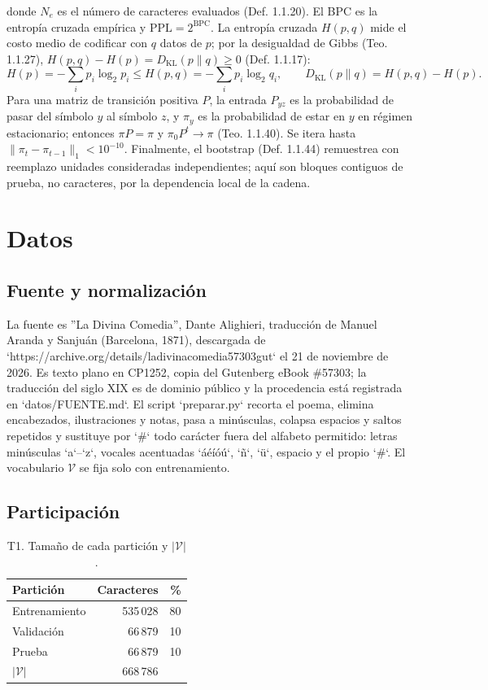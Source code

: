 \documentclass[11pt,letterpaper]{article}
\newcommand{\V}{\mathcal{V}}
\begin{document}
	donde $N_e$ es el número de caracteres evaluados (Def. 1.1.20). El BPC es la entropía cruzada empírica y $\mathrm{PPL}=2^{\mathrm{BPC}}$. La entropía cruzada $H(p,q)$ mide el costo medio de codificar con $q$ datos de $p$; por la desigualdad de Gibbs (Teo. 1.1.27), $H(p,q)-H(p)=D_{\mathrm{KL}}(p\|q)\ge0$ (Def. 1.1.17):
	\begin{equation}
		H(p)=-\sum_i p_i\log_2 p_i\le H(p,q)=-\sum_i p_i\log_2 q_i,
		\qquad D_{\mathrm{KL}}(p\|q)=H(p,q)-H(p). \tag{4}
	\end{equation}
	Para una matriz de transición positiva $P$, la entrada $P_{yz}$ es la probabilidad de pasar del símbolo $y$ al símbolo $z$, y $\pi_y$ es la probabilidad de estar en $y$ en régimen estacionario; entonces $\pi P=\pi$ y $\pi_0P^t\to\pi$ (Teo. 1.1.40). Se itera hasta $\|\pi_t-\pi_{t-1}\|_1<10^{-10}$. Finalmente, el bootstrap (Def. 1.1.44) remuestrea con reemplazo unidades consideradas independientes; aquí son bloques contiguos de prueba, no caracteres, por la dependencia local de la cadena.
	
	\section{Datos}	

	\subsection{Fuente y normalización}
	La fuente es ''La Divina Comedia'', Dante Alighieri, traducción de Manuel Aranda y Sanjuán (Barcelona, 1871), descargada de `https://archive.org/details/ladivinacomedia57303gut` el 21 de noviembre de 2026. Es texto plano en CP1252, copia del Gutenberg eBook \#57303; la traducción del siglo XIX es de dominio público y la procedencia está registrada en `datos/FUENTE.md`. El script `preparar.py` recorta el poema, elimina encabezados, ilustraciones y notas, pasa a minúsculas, colapsa espacios y saltos repetidos y sustituye por `\#` todo carácter fuera del alfabeto permitido: letras minúsculas `a`--`z`, vocales acentuadas `áéíóú`, `ñ`, `ü`, espacio y el propio `\#`. El vocabulario $\mathcal V$ se fija solo con entrenamiento.

	\subsection{Participación}
	\begin{table}[htbp]
		\centering
		\caption{T1. Tamaño de cada partición y $|\V|$.}
		\label{tab:T1}
		\begin{tabular}{lrr}
			\toprule
			Partición & Caracteres & \% \\
			\midrule
			Entrenamiento & {535\,028} & 80 \\
			Validación    & {66\,879} & 10 \\
			Prueba        & {66\,879} & 10 \\
			\midrule
			$|\V|$        & {668\,786} & \\
			\bottomrule
		\end{tabular}
	\end{table}
	
\end{document}

